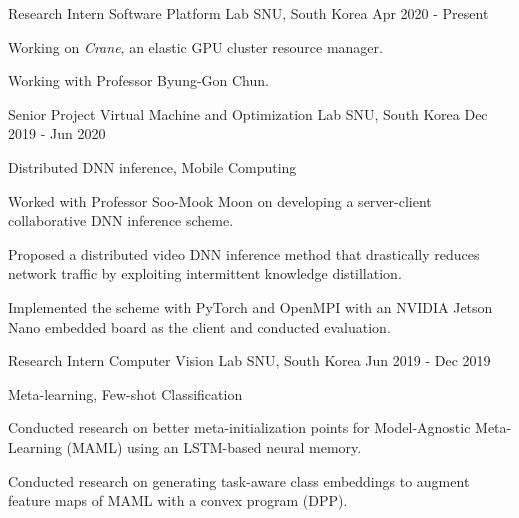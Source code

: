 

\begin{cventries}

  \cventry
    {Research Intern} %
    {Software Platform Lab} %
    {SNU, South Korea} %
    {Apr 2020 - Present} %
    {
      \begin{cvitems} %
        \item {Working on \textit{Crane}, an elastic GPU cluster resource manager.}
        \item {Working with Professor Byung-Gon Chun.}
      \end{cvitems}
    }
    
  \cventry
    {Senior Project} %
    {Virtual Machine and Optimization Lab} %
    {SNU, South Korea} %
    {Dec 2019 - Jun 2020} %
    {
      \begin{cvitems} %
        \item {Distributed DNN inference, Mobile Computing}
        \item {Worked with Professor Soo-Mook Moon on developing a server-client collaborative DNN inference scheme.}
        \item {Proposed a distributed video DNN inference method that drastically reduces network traffic by exploiting intermittent knowledge distillation.}
        \item {Implemented the scheme with PyTorch and OpenMPI with an NVIDIA Jetson Nano embedded board as the client and conducted evaluation.}
      \end{cvitems}
    }
    
  \cventry
    {Research Intern} %
    {Computer Vision Lab} %
    {SNU, South Korea} %
    {Jun 2019 - Dec 2019} %
    {
      \begin{cvitems} %
        \item {Meta-learning, Few-shot Classification}
        \item {Conducted research on better meta-initialization points for Model-Agnostic Meta-Learning (MAML) using an LSTM-based neural memory.}
        \item {Conducted research on generating task-aware class embeddings to augment feature maps of MAML with a convex program (DPP).}
      \end{cvitems}
    }
    

\end{cventries}

